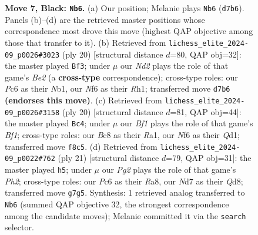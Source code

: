 \documentclass[11pt]{article}
\begin{document}
\begin{figure}[p]
\caption{\textbf{Move 7, Black: \texttt{Nb6}.} (a) Our position; Melanie plays \texttt{Nb6} (\texttt{d7b6}). Panels (b)--(d) are the retrieved master positions whose correspondence most drove this move (highest QAP objective among those that transfer to it). (b) Retrieved from \texttt{lichess\_elite\_2024-09\_p0026\#3023} (ply 20) [structural distance $d$=80, QAP obj=32]: the master played \texttt{Bf3}; under $\mu$ our \emph{Nd2} plays the role of that game's \emph{Be2} (a \textbf{cross-type} correspondence); cross-type roles: our \emph{P}c6 as their \emph{N}b1, our \emph{N}f6 as their \emph{R}h1; transferred move \texttt{d7b6} \textbf{(endorses this move)}. (c) Retrieved from \texttt{lichess\_elite\_2024-09\_p0026\#3158} (ply 20) [structural distance $d$=81, QAP obj=44]: the master played \texttt{Bc4}; under $\mu$ our \emph{Bf1} plays the role of that game's \emph{Bf1}; cross-type roles: our \emph{B}c8 as their \emph{R}a1, our \emph{N}f6 as their \emph{Q}d1; transferred move \texttt{f8c5}. (d) Retrieved from \texttt{lichess\_elite\_2024-09\_p0022\#762} (ply 21) [structural distance $d$=79, QAP obj=31]: the master played \texttt{h5}; under $\mu$ our \emph{Pg2} plays the role of that game's \emph{Ph2}; cross-type roles: our \emph{P}c6 as their \emph{R}a8, our \emph{N}d7 as their \emph{Q}d8; transferred move \texttt{g7g5}. Synthesis: 1 retrieved analog transferred to \texttt{Nb6} (summed QAP objective 32, the strongest correspondence among the candidate moves); Melanie committed it via the \texttt{search} selector.}
\label{fig:thought-m13}
\end{figure}

\clearpage
\end{document}
